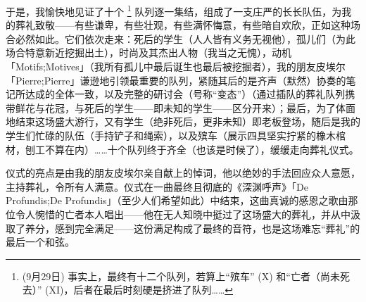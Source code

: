 于是，我愉快地见证了十个 \footnote{(9月29日) 事实上，最终有十二个队列，若算上“殡车” (X) 和“亡者（尚未死去）” (XI)，后者在最后时刻硬是挤进了队列……} 队列逐一集结，组成了一支庄严的长长队伍，为我的葬礼致敬——有些谦卑，有些壮观，有些满怀悔意，有些暗自欢欣，正如这种场合必然如此。它们依次走来：死后的学生（人人皆有义务无视他），孤儿们（为此场合特意新近挖掘出土），时尚及其杰出人物（我当之无愧），动机「Motifs;Motives」（我所有孤儿中最后诞生也最后被挖掘者），我的朋友皮埃尔「Pierre;Pierre」谦逊地引领最重要的队列，紧随其后的是齐声（默然）协奏的笔记所达成的全体一致，以及完整的研讨会（号称“变态”）（通过插队的葬礼队列携带鲜花与花冠，与死后的学生——即未知的学生——区分开来）；最后，为了体面地结束这场盛大游行，又有学生（绝非死后，更非未知）即老板登场，随后是我的学生们忙碌的队伍（手持铲子和绳索），以及殡车（展示四具坚实拧紧的橡木棺材，刨工不算在内）……十个队列终于齐全（也该是时候了），缓缓走向葬礼仪式。

仪式的亮点是由我的朋友皮埃尔亲自献上的悼词，他以绝妙的手法回应众人意愿，主持葬礼，令所有人满意。仪式在一曲最终且彻底的《深渊呼声》「De Profundis;De Profundis」（至少人们希望如此）中结束，这曲真诚的感恩之歌由那位令人惋惜的亡者本人唱出——他在无人知晓中挺过了这场盛大的葬礼，并从中汲取了养分，感到完全满足——这份满足构成了最终的音符，也是这场难忘“葬礼”的最后一个和弦。